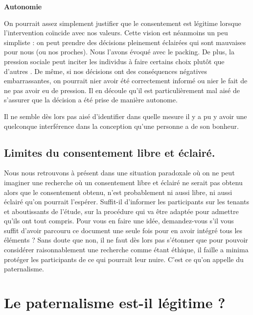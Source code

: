 \documentclass[
  12pt,
]{book}
\begin{document}
\textbf{Autonomie}

On pourrait assez simplement justifier que le consentement est légitime lorsque l'intervention coïncide avec nos valeurs. Cette vision est néanmoins un peu simpliste : on peut prendre des décisions pleinement éclairées qui sont mauvaises pour nous (ou nos proches). Nous l'avons évoqué avec le packing. De plus, la pression sociale peut inciter les individus à faire certains choix plutôt que d'autres \citep{Dworkin1988}. De même, si nos décisions ont des conséquences négatives embarrassantes, on pourrait nier avoir été correctement informé ou nier le fait de ne pas avoir eu de pression.
Il en découle qu'il est particulièrement mal aisé de s'assurer que la décision a été prise de manière autonome.

Il ne semble dès lors pas aisé d'identifier dans quelle mesure il y a pu y avoir une quelconque interférence dans la conception qu'une personne a de son bonheur.

\section{Limites du consentement libre et éclairé.}\label{limites-du-consentement-libre-et-uxe9clairuxe9.}

Nous nous retrouvons à présent dans une situation paradoxale où on ne peut imaginer une recherche où un consentement libre et éclairé ne serait pas obtenu alors que le consentement obtenu, n'est probablement ni aussi libre, ni aussi éclairé qu'on pourrait l'espérer. Suffit-il d'informer les participants sur les tenants et aboutissants de l'étude, sur la procédure qui va être adaptée pour admettre qu'ils ont tout compris. Pour vous en faire une idée, demandez-vous s'il vous suffit d'avoir parcouru ce document une seule fois pour en avoir intégré tous les éléments ? Sans doute que non, il ne faut dès lors pas s'étonner que pour pouvoir considérer raisonnablement une recherche comme étant éthique, il faille a minima protéger les participants de ce qui pourrait leur nuire. C'est ce qu'on appelle du paternalisme.

\chapter{Le paternalisme est-il légitime ?}\label{le-paternalisme-est-il-luxe9gitime}
\end{document}
